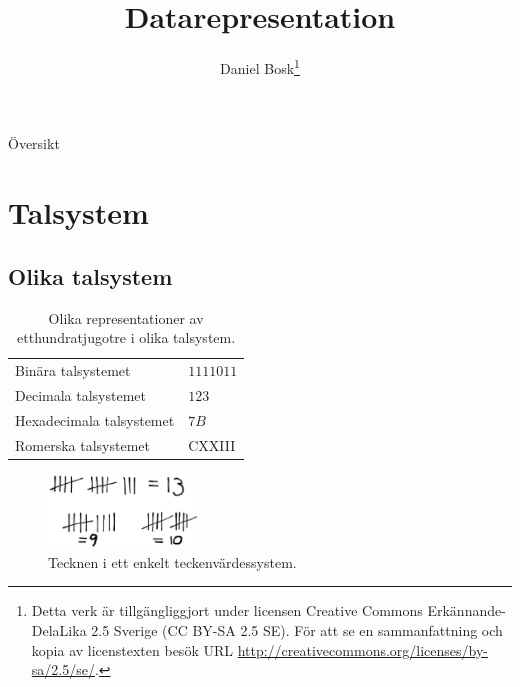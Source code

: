 \documentclass{beamer}
\title{%
  Datarepresentation
}
\author{Daniel Bosk\footnote{%
  \tiny
  Detta verk är tillgängliggjort under licensen Creative Commons 
  Erkännande-DelaLika 2.5 Sverige (CC BY-SA 2.5 SE).
  För att se en sammanfattning och kopia av licenstexten besök URL 
  \url{http://creativecommons.org/licenses/by-sa/2.5/se/}.
}}
\institute[MIUN ITM]{%
  Avdelningen för informations- och kommunikationssytem (IKS),\\
  Mittuniversitetet, Sundsvall.
}
\date{\svnId}
\theoremstyle{definition}
\theoremstyle{remark}
\begin{document}
\begin{frame}
  \titlepage
\end{frame}

\begin{frame}{Översikt}
  \tableofcontents
\end{frame}
\begin{frame}
  
\end{frame}





\section{Talsystem}

\subsection{Olika talsystem}

\begin{frame}{\insertsubsectionhead}
  \begin{table}
    \caption{Olika representationer av etthundratjugotre i olika talsystem.}
    \begin{tabular}{ll}
      \toprule
      Binära talsystemet & \(1111011\) \\
      Decimala talsystemet & \(123\) \\
      Hexadecimala talsystemet & \(7B\) \\
      Romerska talsystemet & CXXIII \\
      \bottomrule
    \end{tabular}
    \label{tbl:OlikaEtthundratjugotre}
  \end{table}
\end{frame}

\begin{frame}{\insertsubsectionhead}
  \begin{figure}
    \includegraphics[width=4cm]{strecktal.eps}
    \caption{Tecknen i ett enkelt teckenvärdessystem.}
    \label{fig:Strecktal}
  \end{figure}
\end{frame}
\end{document}
